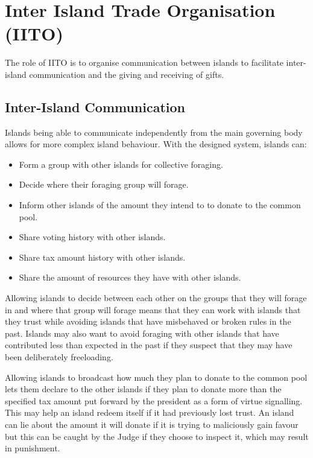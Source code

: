 \chapter{Inter Island Trade Organisation (IITO)}

The role of IITO is to organise communication between islands to facilitate inter-island communication and the giving and receiving of gifts.


\section{Inter-Island Communication}  
\label{sec:IITO:inter_island_communication}

Islands being able to communicate independently from the main governing body allows for more complex island behaviour. With the designed system, islands can:

\begin{itemize}
    \item Form a group with other islands for collective foraging.
    \item Decide where their foraging group will forage.
    \item Inform other islands of the amount they intend to to donate to the common pool.
    \item Share voting history with other islands.
    \item Share tax amount history with other islands.
    \item Share the amount of resources they have with other islands.
\end{itemize}

Allowing islands to decide between each other on the groups that they will forage in and where that group will forage means that they can work with islands that they trust while avoiding islands that have misbehaved or broken rules in the past. Islands may also want to avoid foraging with other islands that have contributed less than expected in the past if they suspect that they may have been deliberately freeloading.

Allowing islands to broadcast how much they plan to donate to the common pool lets them declare to the other islands if they plan to donate more than the specified tax amount put forward by the president as a form of virtue signalling. This may help an island redeem itself if it had previously lost trust. An island can lie about the amount it will donate if it is trying to maliciously gain favour but this can be caught by the Judge if they choose to inspect it, which may result in punishment.

